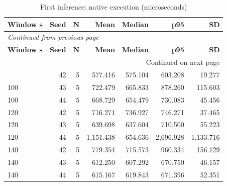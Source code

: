 \documentclass[10pt,a4paper]{article}
\begin{document}
\begin{longtable}{@{}lrrrrrr@{}}
\caption{First inference:\allowbreak{} native execution (microseconds)}\\
\toprule
\textbf{Window s} & \textbf{Seed} & \textbf{N} & \textbf{Mean} & \textbf{Median} & \textbf{p95} & \textbf{SD} \\
\midrule\endfirsthead
\multicolumn{7}{l}{\small\itshape Continued from previous page}\\
\toprule
\textbf{Window s} & \textbf{Seed} & \textbf{N} & \textbf{Mean} & \textbf{Median} & \textbf{p95} & \textbf{SD} \\
\midrule\endhead
\midrule\multicolumn{7}{r}{\small Continued on next page}\\\endfoot
\bottomrule\endlastfoot
100 & 42 & 5 & 577.416 & 575.104 & 603.208 & 19.277 \\
100 & 43 & 5 & 722.479 & 665.833 & 878.260 & 115.603 \\
100 & 44 & 5 & 668.729 & 654.479 & 730.083 & 45.456 \\
120 & 42 & 5 & 716.271 & 736.927 & 746.271 & 37.465 \\
120 & 43 & 5 & 639.698 & 637.604 & 710.500 & 55.223 \\
120 & 44 & 5 & 1,151.438 & 654.636 & 2,696.928 & 1,133.716 \\
140 & 42 & 5 & 779.354 & 715.573 & 960.334 & 156.129 \\
140 & 43 & 5 & 612.250 & 607.292 & 670.750 & 46.157 \\
140 & 44 & 5 & 615.167 & 619.843 & 671.396 & 52.351 \\
\end{longtable}\endgroup
\begingroup\small\setlength{\tabcolsep}{4pt}\renewcommand{\arraystretch}{1.12}
\end{document}
